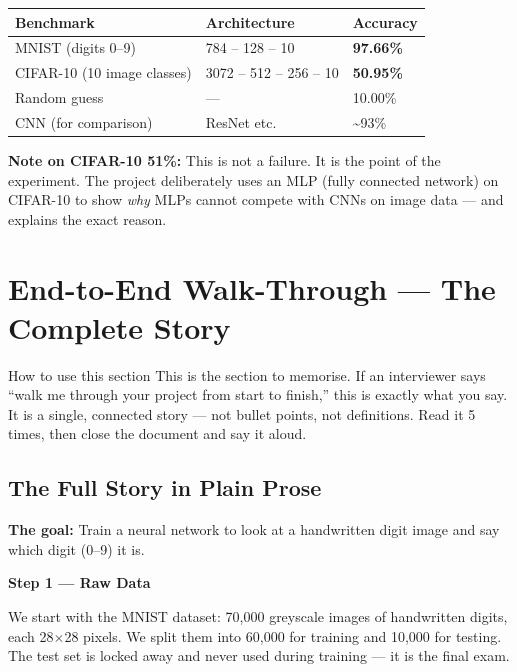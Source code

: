 \documentclass[12pt, a4paper]{article}
\begin{document}
\begin{center}
\begin{tabular}{lll}
  \toprule
  \textbf{Benchmark} & \textbf{Architecture} & \textbf{Accuracy} \\
  \midrule
  MNIST (digits 0--9) & 784 -- 128 -- 10 & \textbf{97.66\%} \\
  CIFAR-10 (10 image classes) & 3072 -- 512 -- 256 -- 10 & \textbf{50.95\%} \\
  Random guess & --- & 10.00\% \\
  CNN (for comparison) & ResNet etc. & \textasciitilde93\% \\
  \bottomrule
\end{tabular}
\end{center}

\textbf{Note on CIFAR-10 51\%:} This is not a failure. It is the point of the experiment. The project deliberately uses an MLP (fully connected network) on CIFAR-10 to show \textit{why} MLPs cannot compete with CNNs on image data --- and explains the exact reason.

\section{End-to-End Walk-Through --- The Complete Story}

\begin{warningbox}{How to use this section}
This is the section to memorise. If an interviewer says ``walk me through your project from start to finish,'' this is exactly what you say. It is a single, connected story --- not bullet points, not definitions. Read it 5 times, then close the document and say it aloud.
\end{warningbox}

\subsection{The Full Story in Plain Prose}

\textbf{The goal:} Train a neural network to look at a handwritten digit image and say which digit (0--9) it is.

\textbf{Step 1 --- Raw Data}

We start with the MNIST dataset: 70,000 greyscale images of handwritten digits, each 28$\times$28 pixels. We split them into 60,000 for training and 10,000 for testing. The test set is locked away and never used during training --- it is the final exam.
\end{document}
